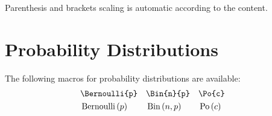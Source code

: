\documentclass[11pt, a4paper]{article}
\begin{document}
\noindent
Parenthesis and brackets scaling is automatic according to the content.


\section{Probability Distributions}

The following macros for probability distributions are available:
\begin{align*}
	&  \texttt{\textbackslash Bernoulli\{p\}}
	&& \texttt{\textbackslash Bin\{n\}\{p\}}
	&& \texttt{\textbackslash Po\{c\}}
	&  \\
	&  \operatorname{Bernoulli}\left( p \right) 
	&& \operatorname{Bin}\left( n, p \right)
	&& \operatorname{Po}\left( c \right)
\end{align*}
\end{document}
